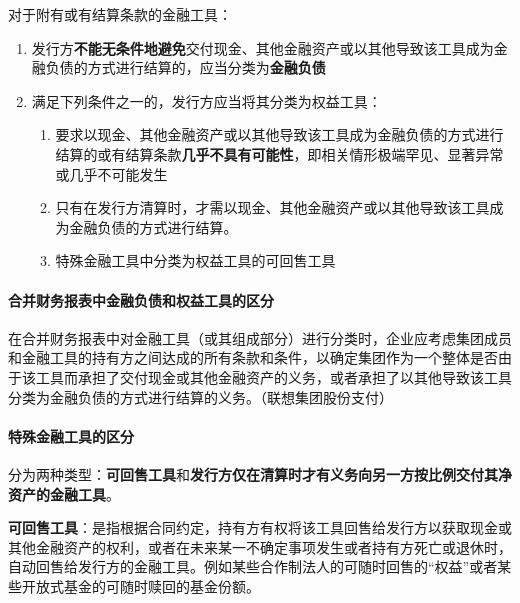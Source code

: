 \documentclass[UTF8,12pt]{ctexart}
\numberwithin{equation}{section} %
\numberwithin{figure}{section}
\numberwithin{table}{section}
\begin{document}
	对于附有或有结算条款的金融工具：
	\begin{enumerate}
		\item 发行方\textbf{不能无条件地避免}交付现金、其他金融资产或以其他导致该工具成为金融负债的方式进行结算的，应当分类为\textbf{金融负债}
		
		\item 满足下列条件之一的，发行方应当将其分类为权益工具：
		\begin{enumerate}
			\item 要求以现金、其他金融资产或以其他导致该工具成为金融负债的方式进行结算的或有结算条款\textbf{几乎不具有可能性}，即相关情形极端罕见、显著异常或几乎不可能发生
			
			\item 只有在发行方清算时，才需以现金、其他金融资产或以其他导致该工具成为金融负债的方式进行结算。
			
			\item 特殊金融工具中分类为权益工具的可回售工具
		\end{enumerate}
	\end{enumerate}
	
	\paragraph{合并财务报表中金融负债和权益工具的区分}
	在合并财务报表中对金融工具（或其组成部分）进行分类时，企业应考虑集团成员和金融工具的持有方之间达成的所有条款和条件，以确定集团作为一个整体是否由于该工具而承担了交付现金或其他金融资产的义务，或者承担了以其他导致该工具分类为金融负债的方式进行结算的义务。（联想集团股份支付）
	
	\paragraph{特殊金融工具的区分}
	分为两种类型：\textbf{可回售工具}和\textbf{发行方仅在清算时才有义务向另一方按比例交付其净资产的金融工具}。
	
	\textbf{可回售工具}：是指根据合同约定，持有方有权将该工具回售给发行方以获取现金或其他金融资产的权利，或者在未来某一不确定事项发生或者持有方死亡或退休时，自动回售给发行方的金融工具。例如某些合作制法人的可随时回售的“权益”或者某些开放式基金的可随时赎回的基金份额。
	
\end{document}
